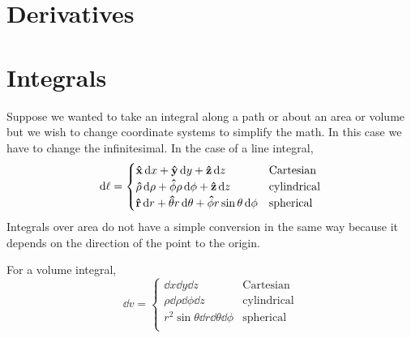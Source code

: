 \section{Derivatives}

\section{Integrals}
Suppose we wanted to take an integral along a path or about an area or volume but we wish to change coordinate systems to simplify the math.  In this case we have to change the infinitesimal.  In the case of a line integral,
\begin{equation*}
    \dd{\ell} = 
    \begin{cases}
        \vu{x} \dd{x} + \vu{y} \dd{y} + \vu{z} \dd{z} & \text{Cartesian} \\
        \vu{\rho} \dd{\rho} + \vu{\phi} \rho \dd{\phi} + \vu{z} \dd{z} &
            \text{cylindrical} \\
        \vu{r} \dd{r} + \vu{\theta} r \dd{\theta} + \vu{\phi} r \sin
            \theta \dd{\phi} & \text{spherical}\\
    \end{cases}
\end{equation*}
Integrals over area do not have a simple conversion in the same way because it
depends on the direction of the point to the origin.

For a volume integral,
\begin{equation*}
    \dd{v} =
    \begin{cases}
        \dd{x} \dd{y} \dd{z} & \text{Cartesian} \\
        \rho \dd{\rho} \dd{\phi} \dd{z} & \text{cylindrical} \\
        r^2 \sin \theta \dd{r} \dd{\theta} \dd{\phi} & \text{spherical} \\
    \end{cases}
\end{equation*}
